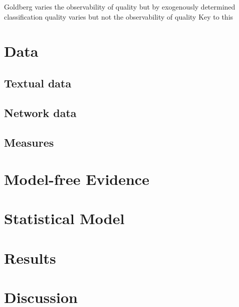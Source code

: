 Goldberg varies the observability of quality but by exogenously determined classification
quality varies but not the observability of quality
Key to this 

\section{Data}
\subsection{Textual data}
\subsection{Network data}
\subsection{Measures}
\section{Model-free Evidence}
\section{Statistical Model}
\section{Results}
\section{Discussion}